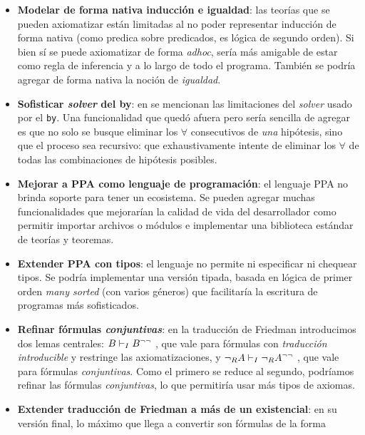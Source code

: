 \begin{itemize}
    \item \textbf{Modelar de forma nativa inducción e igualdad}: las teorías que
    se pueden axiomatizar están limitadas al no poder representar inducción de
    forma nativa (como predica sobre predicados, es lógica de segundo orden). Si
    bien sí se puede axiomatizar de forma \textit{adhoc}, sería más amigable de
    estar como regla de inferencia y a lo largo de todo el programa. También se
    podría agregar de forma nativa la noción de \textit{igualdad}.
    \item \textbf{Sofisticar \textit{solver} del by}: en
     se mencionan las limitaciones del
    \textit{solver} usado por el \lstinline{by}. Una funcionalidad que quedó
    afuera pero sería sencilla de agregar es que no solo se busque eliminar los
    $\forall$ consecutivos de \textit{una} hipótesis, sino que el proceso sea
    recursivo: que exhaustivamente intente de eliminar los $\forall$ de todas
    las combinaciones de hipótesis posibles.
    \item \textbf{Mejorar a PPA como lenguaje de programación}: el
    lenguaje PPA no brinda soporte para tener un ecosistema. Se pueden agregar
    muchas funcionalidades que mejorarían la calidad de vida del desarrollador
    como permitir importar archivos o módulos e implementar una biblioteca
    estándar de teorías y teoremas.
    \item \textbf{Extender PPA con tipos}: el lenguaje no permite ni especificar
    ni chequear tipos. Se podría implementar una versión tipada, basada en
    lógica de primer orden \textit{many sorted} (con varios géneros) que
    facilitaría la escritura de programas más sofisticados.
    \item \textbf{Refinar fórmulas \textit{conjuntivas}}: en la traducción de
    Friedman introducimos dos lemas centrales: $B \vdash_I B^{\neg\neg}$
    , que vale para fórmulas con
    \textit{traducción introducible} y restringe las axiomatizaciones, y $\neg_R
    A \vdash_I \neg_R A^{\neg\neg}$ , que
    vale para fórmulas \textit{conjuntivas}. Como el primero se reduce al
    segundo, podríamos refinar las fórmulas \textit{conjuntivas}, lo que
    permitiría usar más tipos de axiomas.
    \item \textbf{Extender traducción de Friedman a más de un existencial}: en
    su versión final, lo máximo que llega a convertir son fórmulas de la forma

\end{itemize}
